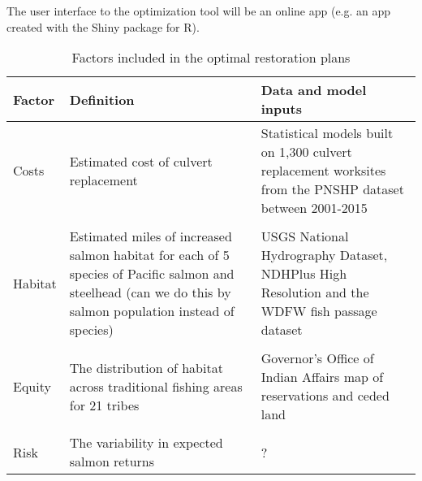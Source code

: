 \documentclass[12pt]{elsarticle}
\begin{document}
The user interface to the optimization tool will be an online app (e.g. an app created with the Shiny package for R).


\begin{table}[htbp]
  \centering
  \caption{Factors included in the optimal restoration plans}
    \begin{tabular}{llp{18.835em}}\hline
    \textbf{Factor} & \textbf{Definition} & \multicolumn{1}{l}{\textbf{Data and model inputs}} \\\hline
    Costs & Estimated cost of culvert replacement & Statistical models built on 1,300 culvert replacement worksites from the PNSHP dataset between 2001-2015 \\
& &\\
    Habitat & \multicolumn{1}{p{17.335em}}{Estimated miles of increased salmon habitat for each of 5 species of Pacific salmon and steelhead (can we do this by salmon population instead of species)} & USGS National Hydrography Dataset, NDHPlus High Resolution and the WDFW fish passage dataset \\
& &\\
    Equity & \multicolumn{1}{p{17.335em}}{The distribution of habitat across traditional fishing areas for 21 tribes} & Governor's Office of Indian Affairs map of reservations and ceded land \\
& &\\
    Risk  & The variability in expected salmon returns & ? \\\hline
    \end{tabular}%
  \label{tab:factors}%
\end{table}%
\end{document}
